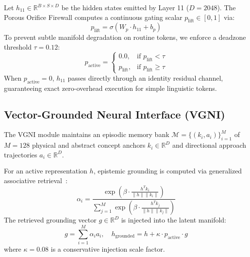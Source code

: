 \documentclass[11pt,a4paper]{article}
\begin{document}
Let $h_{11} \in \mathbb{R}^{B \times S \times D}$ be the hidden states emitted by Layer 11 ($D = 2048$). The Porous Orifice Firewall computes a continuous gating scalar $p_{\text{lift}} \in [0, 1]$ via:
\begin{equation}
p_{\text{lift}} = \sigma\left(W_p \cdot h_{11} + b_p\right)
\end{equation}
To prevent subtle manifold degradation on routine tokens, we enforce a deadzone threshold $\tau = 0.12$:
\begin{equation}
p_{\text{active}} = \begin{cases} 
0.0, & \text{if } p_{\text{lift}} < \tau \\ 
p_{\text{lift}}, & \text{if } p_{\text{lift}} \ge \tau 
\end{cases}
\end{equation}
When $p_{\text{active}} = 0$, $h_{11}$ passes directly through an identity residual channel, guaranteeing exact zero-overhead execution for simple linguistic tokens.

\subsection{Vector-Grounded Neural Interface (VGNI)}
The VGNI module maintains an episodic memory bank $\mathcal{M} = \{(k_i, a_i)\}_{i=1}^M$ of $M = 128$ physical and abstract concept anchors $k_i \in \mathbb{R}^D$ and directional approach trajectories $a_i \in \mathbb{R}^D$.

For an active representation $h$, epistemic grounding is computed via generalized associative retrieval~\cite{ramsauer2020hopfield}:
\begin{equation}
\alpha_i = \frac{\exp\left(\beta \cdot \frac{h^T k_i}{\|h\| \|k_i\|}\right)}{\sum_{j=1}^M \exp\left(\beta \cdot \frac{h^T k_j}{\|h\| \|k_j\|}\right)}
\end{equation}
The retrieved grounding vector $g \in \mathbb{R}^D$ is injected into the latent manifold:
\begin{equation}
g = \sum_{i=1}^M \alpha_i a_i, \quad h_{\text{grounded}} = h + \kappa \cdot p_{\text{active}} \cdot g
\end{equation}
where $\kappa = 0.08$ is a conservative injection scale factor.
\end{document}
